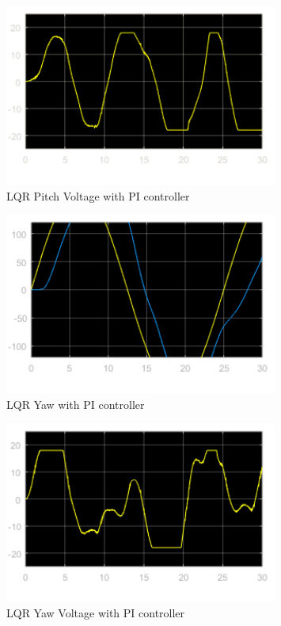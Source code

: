 \documentclass[fontsize=11pt, %
                             paper=letter, %
                             openany, %
                             captions=tableheading,
                             index=totoc,
                             hyperref]{labbook}
\begin{document}
\begin{addmargin}[0cm]{0cm}
\begin{figure}
  \centering
  \includegraphics[width=0.8\textwidth]{figs/img/02152019/LQR_PitchVolt.png}
  \caption{LQR Pitch Voltage with PI controller}
  \label{fig:LQR_PI_PitchVolt}
\end{figure}

\begin{figure}
  \centering
  \includegraphics[width=0.8\textwidth]{figs/img/02152019/LQR_Yaw.png}
  \caption{LQR Yaw with PI controller}
  \label{fig:LQR_PI_Pitch}
\end{figure}

\begin{figure}
  \centering
  \includegraphics[width=0.8\textwidth]{figs/img/02152019/LQR_YawVolt.png}
  \caption{LQR Yaw Voltage with PI controller}
  \label{fig:LQR_PI_YawVolt}
\end{figure}


\end{addmargin}
\end{document}
